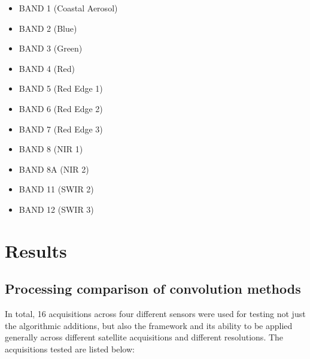 \documentclass[a4paper]{article}
\begin{document}
\begin{itemize}
\begin{itemize}
          \item \footnotesize{BAND 1 (Coastal Aerosol)}
          \item \footnotesize{BAND 2 (Blue)}
          \item \footnotesize{BAND 3 (Green)}
          \item \footnotesize{BAND 4 (Red)}
          \item \footnotesize{BAND 5 (Red Edge 1)}
          \item \footnotesize{BAND 6 (Red Edge 2)}
          \item \footnotesize{BAND 7 (Red Edge 3)}
          \item \footnotesize{BAND 8 (NIR 1)}
          \item \footnotesize{BAND 8A (NIR 2)}
          \item \footnotesize{BAND 11 (SWIR 2)}
          \item \footnotesize{BAND 12 (SWIR 3)}
        \end{itemize}
    \end{itemize}

    \section{Results}

    \subsection{Processing comparison of convolution methods}

    \begin{flushleft}
      In total, 16 acquisitions across four different sensors were used for testing not just the algorithmic additions, but also the framework and its ability to be applied generally across different satellite acquisitions and different resolutions. The acquisitions tested are listed below:
    \end{flushleft}
\end{document}
